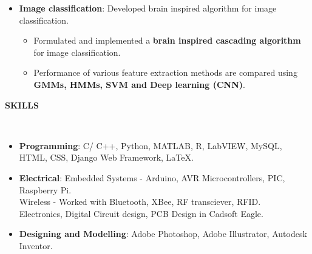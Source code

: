 \documentclass[a4paper,10pt]{article}
\newcommand{\lsep}{-0.5cm}
\newcommand{\resheading}[1]{{\small \colorbox{mygrey}{\begin{minipage}{0.975\textwidth}{\textbf{#1 \vphantom{p\^{E}}}}\end{minipage}}}}
\begin{document}
\begin{itemize}
        \vspace{-5pt}
        \item \textbf{Image classification}: Developed brain inspired algorithm for image classification.
        \begin{itemize}
        \vspace{-5pt}
            \item Formulated and implemented a \textbf{brain inspired cascading algorithm} for image classification.
            \item Performance of various feature extraction methods are compared using \textbf{GMMs, HMMs, SVM and Deep learning (CNN)}.            
        \end{itemize}
    \end{itemize}

\resheading{\textbf{SKILLS} }\\[\lsep]
    \begin{itemize}
        \item \textbf{Programming}: C/ C++, Python, MATLAB, R, LabVIEW, MySQL, HTML, CSS, Django Web Framework, \LaTeX.
        \vspace{-5pt}
        \item \textbf{Electrical}: Embedded Systems - Arduino,  AVR Microcontrollers, PIC,  Raspberry Pi.\\
        Wireless - Worked with Bluetooth, XBee, RF transciever, RFID.\\
        Electronics, Digital Circuit design, PCB Design in Cadsoft Eagle.
        \vspace{-5pt}
        \item \textbf{Designing and Modelling}: Adobe Photoshop, Adobe Illustrator, Autodesk Inventor.
    \end{itemize}
\end{document}
